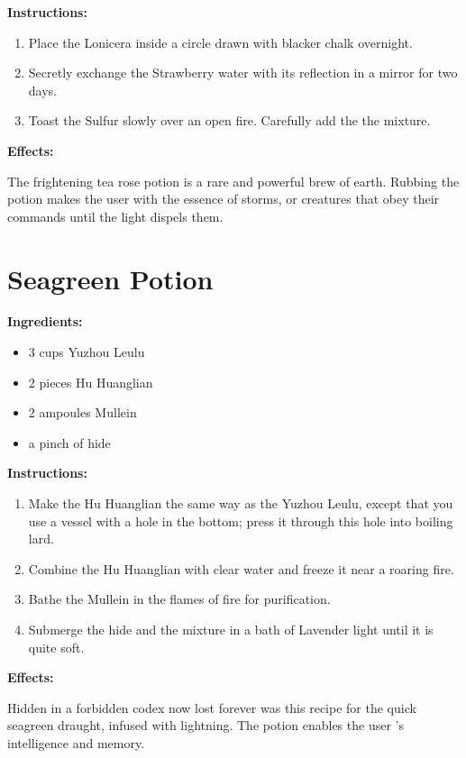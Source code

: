 \documentclass{article}
\begin{document}
\textbf{Instructions:}

\begin{enumerate}
  \item Place the Lonicera inside a circle drawn with blacker chalk overnight.
  \item Secretly exchange the Strawberry water with its reflection in a mirror for two days.
  \item Toast the Sulfur slowly over an open fire. Carefully add the the mixture.
\end{enumerate}

\textbf{Effects:}

The frightening tea rose potion is a rare and powerful brew of earth. Rubbing the potion makes the user with the essence of storms, or creatures that obey their commands until the light dispels them.

\newpage
\section*{Seagreen Potion}

\textbf{Ingredients:}

\begin{itemize}
  \item 3 cups Yuzhou Leulu
  \item 2 pieces Hu Huanglian
  \item 2 ampoules Mullein
  \item a pinch of hide
\end{itemize}

\textbf{Instructions:}

\begin{enumerate}
  \item Make the Hu Huanglian the same way as the Yuzhou Leulu, except that you use a vessel with a hole in the bottom; press it through this hole into boiling lard.
  \item Combine the Hu Huanglian with clear water and freeze it near a roaring fire.
  \item Bathe the Mullein in the flames of fire for purification.
  \item Submerge the hide and the mixture in a bath of Lavender light until it is quite soft.
\end{enumerate}

\textbf{Effects:}

Hidden in a forbidden codex now lost forever was this recipe for the quick seagreen draught, infused with lightning. The potion enables the user 's intelligence and memory.
\end{document}

